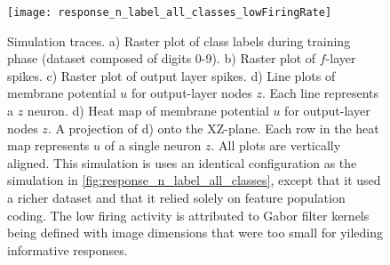 \documentclass{report}
\begin{document}
\begin{figure}[ht]
\centering
\texttt{[image: response\_n\_label\_all\_classes\_lowFiringRate]}
\caption{Simulation traces. a) Raster plot of class labels during training phase (dataset composed of digits 0-9). b) Raster plot of $f$-layer spikes. c) Raster plot of output layer spikes. d) Line plots of membrane potential $u$ for output-layer nodes $z$. Each line represents a $z$ neuron. d) Heat map of membrane potential $u$ for output-layer nodes $z$. A projection of d) onto the XZ-plane. Each row in the heat map represents $u$ of a single neuron $z$. All plots are vertically aligned. This simulation is uses an identical configuration as the simulation in \cref{fig:response_n_label_all_classes}, except that it used a richer dataset and that it relied solely on feature population coding. The low firing activity is attributed to Gabor filter kernels being defined with image dimensions that were too small for yileding informative responses.
\label{fig:response_n_label_all_classes_lowFiringRate}}
\end{figure}
\end{document}
